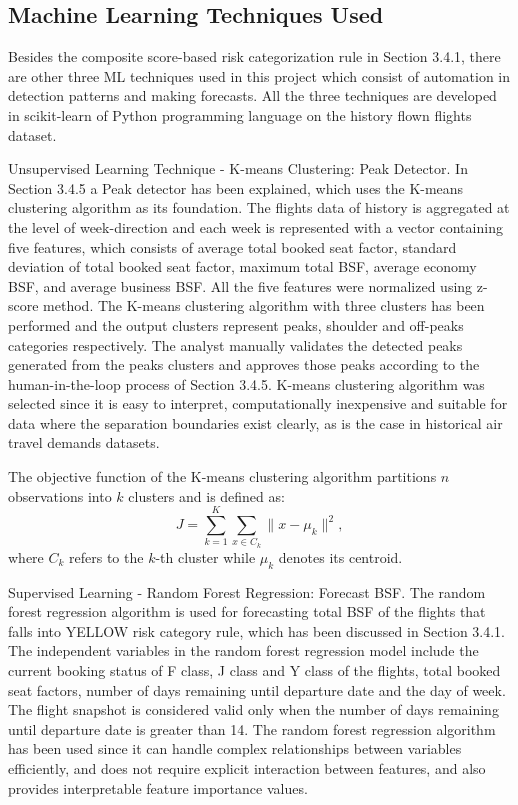 \subsection{Machine Learning Techniques Used}

Besides the composite score-based risk categorization rule in Section 3.4.1, there are other three ML techniques used in this project which consist of automation in detection patterns and making forecasts. All the three techniques are developed in scikit-learn of Python programming language on the history flown flights dataset.

Unsupervised Learning Technique - K-means Clustering: Peak Detector. In Section 3.4.5 a Peak detector has been explained, which uses the K-means clustering algorithm as its foundation. The flights data of history is aggregated at the level of week-direction and each week is represented with a vector containing five features, which consists of average total booked seat factor, standard deviation of total booked seat factor, maximum total BSF, average economy BSF, and average business BSF. All the five features were normalized using z-score method. The K-means clustering algorithm with three clusters has been performed and the output clusters represent peaks, shoulder and off-peaks categories respectively. The analyst manually validates the detected peaks generated from the peaks clusters and approves those peaks according to the human-in-the-loop process of Section 3.4.5. K-means clustering algorithm was selected since it is easy to interpret, computationally inexpensive and suitable for data where the separation boundaries exist clearly, as is the case in historical air travel demands datasets.

The objective function of the K-means clustering algorithm partitions $n$ observations into $k$ clusters and is defined as:
\[ J = \sum_{k=1}^{K} \sum_{x \in C_k} \| x - \mu_k \|^2, \]
where $C_k$ refers to the $k$-th cluster while $\mu_k$ denotes its centroid.

Supervised Learning - Random Forest Regression: Forecast BSF. The random forest regression algorithm is used for forecasting total BSF of the flights that falls into YELLOW risk category rule, which has been discussed in Section 3.4.1. The independent variables in the random forest regression model include the current booking status of F class, J class and Y class of the flights, total booked seat factors, number of days remaining until departure date and the day of week. The flight snapshot is considered valid only when the number of days remaining until departure date is greater than 14. The random forest regression algorithm has been used since it can handle complex relationships between variables efficiently, and does not require explicit interaction between features, and also provides interpretable feature importance values.

